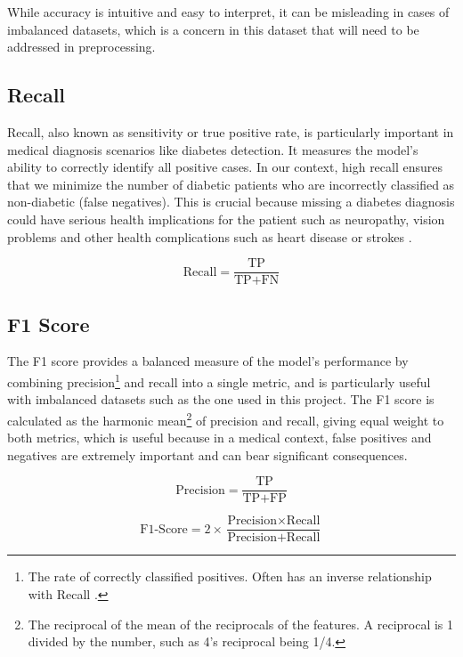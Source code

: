 \documentclass[12pt]{report}
\newcommand{\para}{\vspace{8pt}\noindent}
\begin{document}
\para While accuracy is intuitive and easy to interpret, it can be misleading in cases
of imbalanced datasets, which is a concern in this dataset that will need to be addressed in preprocessing.

\subsection{Recall}
Recall, also known as sensitivity or true positive rate, is particularly important in medical diagnosis scenarios like diabetes detection. It measures
the model's ability to correctly identify all positive cases. In our context, high recall ensures that we minimize the number of diabetic patients
who are incorrectly classified as non-diabetic (false negatives). This is crucial because missing a diabetes diagnosis could have serious health implications for the patient such 
as neuropathy, vision problems and other health complications such as heart disease or strokes \autocite{nhs_type_nodate}.

\begin{equation}\label{eq:Recall}
    \text{Recall} = \frac{\text{TP}}{\text{TP} + \text{FN}}
\end{equation}

\subsection{F1 Score}
The F1 score provides a balanced measure of the model's performance by combining precision\footnote{The rate of correctly classified positives. Often has an inverse relationship with Recall \autocite{google_classification_nodate}.}
and recall into a single metric, and is particularly useful with imbalanced datasets such as the one used in this project.
The F1 score is calculated as the harmonic mean\footnote{The reciprocal of the mean of the reciprocals of the features. A reciprocal is 1 divided by the number, such as 4's reciprocal being 1/4.}
of precision and recall, giving equal weight to both metrics, which is useful because in a medical context, false positives and negatives are extremely important 
and can bear significant consequences.

\begin{equation}\label{eq:Precision}
    \text{Precision} = \frac{\text{TP}}{\text{TP} + \text{FP}}
\end{equation}

\begin{equation}\label{eq:F1Score}
    \text{F1-Score} = 2 \times \frac{\text{Precision} \times \text{Recall}}{\text{Precision} + \text{Recall}}
\end{equation}
\end{document}
